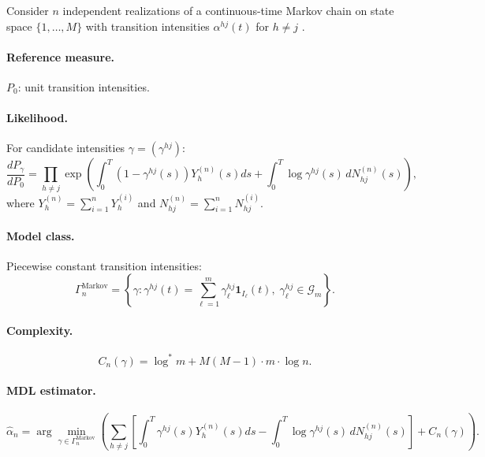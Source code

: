 \documentclass[preprint,review,12pt]{article}
\begin{document}
Consider $n$ independent realizations of a continuous-time Markov chain on 
state space $\{1, \ldots, M\}$ with transition intensities $\alpha^{hj}(t)$ 
for $h \neq j$ \citep{Aalen1978}.

\paragraph{Reference measure.} $P_0$: unit transition intensities.

\paragraph{Likelihood.} For candidate intensities $\gamma = (\gamma^{hj})$:
\begin{equation}\label{eq:markov_likelihood}
\frac{dP_\gamma}{dP_0} = \prod_{h \neq j} \exp\left( 
\int_0^T (1 - \gamma^{hj}(s)) Y_h^{(n)}(s) ds 
+ \int_0^T \log \gamma^{hj}(s) \, dN_{hj}^{(n)}(s) \right),
\end{equation}
where $Y_h^{(n)} = \sum_{i=1}^n Y_h^{(i)}$ and $N_{hj}^{(n)} = \sum_{i=1}^n N_{hj}^{(i)}$.

\paragraph{Model class.} Piecewise constant transition intensities:
\begin{equation}\label{eq:markov_class}
\Gamma_n^{\text{Markov}} = \left\{ \gamma : \gamma^{hj}(t) = 
\sum_{\ell=1}^{m} \gamma^{hj}_\ell \mathbf{1}_{I_\ell}(t), \; 
\gamma^{hj}_\ell \in \mathcal{G}_m \right\}.
\end{equation}

\paragraph{Complexity.}
\begin{equation}\label{eq:markov_complexity}
C_n(\gamma) = \log^* m + M(M-1) \cdot m \cdot \log n.
\end{equation}

\paragraph{MDL estimator.}
\begin{equation}\label{eq:markov_mdl}
\hat{\alpha}_n = \arg\min_{\gamma \in \Gamma_n^{\text{Markov}}} \left( 
\sum_{h \neq j} \left[ \int_0^T \gamma^{hj}(s) Y_h^{(n)}(s) ds 
- \int_0^T \log \gamma^{hj}(s) \, dN_{hj}^{(n)}(s) \right] + C_n(\gamma) \right).
\end{equation}
\end{document}
